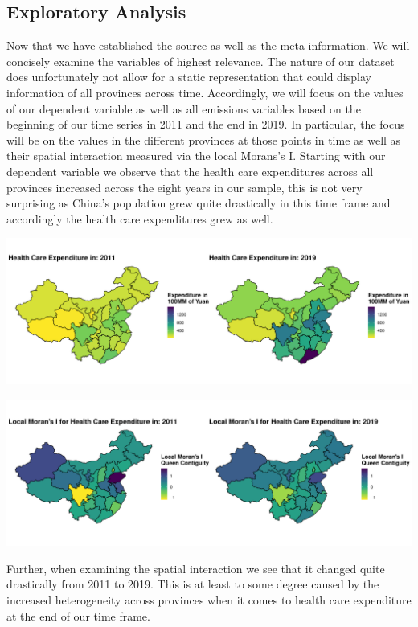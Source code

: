 \documentclass[
]{article}
\begin{document}
	\subsection{Exploratory Analysis}
	Now that we have established the source as well as the meta information. We will concisely examine the variables of highest relevance. The nature of our dataset does unfortunately not allow for a static representation that could display information of all provinces across time. Accordingly, we will focus on the values of our dependent variable as well as all emissions variables based on the beginning of our time series in 2011 and the end in 2019. In particular, the focus will be on the values in the different provinces at those points in time as well as their spatial interaction measured via the local Morans's I. Starting with our dependent variable we observe that the health care expenditures across all provinces increased across the eight years in our sample, this is not very surprising as China's population grew quite drastically in this time frame and accordingly the health care expenditures grew as well.
	\begin{center}
		\includegraphics[width = 440pt]{Health_Care_Expenditures_comp.pdf}
	\end{center}
	\begin{center}
		\includegraphics[width = 440pt]{Ii_Health_Care_Expenditures_comp.pdf}
	\end{center}
	Further, when examining the spatial interaction we see that it changed quite drastically from 2011 to 2019. This is at least to some degree caused by the increased heterogeneity across provinces when it comes to health care expenditure at the end of our time frame.\\
\end{document}
